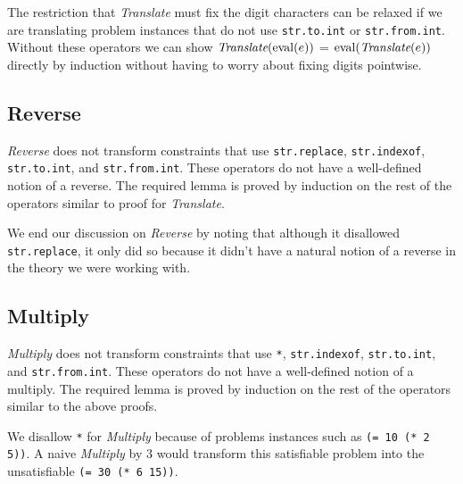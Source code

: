 The restriction that \textit{Translate} must fix the digit characters
can be relaxed if we are translating problem instances that do not use
\texttt{str.to.int} or \texttt{str.from.int}. Without these operators
we can show $\textit{Translate}(\operatorname{eval} (e))$ = $\operatorname{eval}
(\textit{Translate}(e))$ directly by induction without having to worry
about fixing digits pointwise.

\subsection{Reverse}
\textit{Reverse} does not transform constraints that use
\texttt{str.replace}, \texttt{str.indexof}, \texttt{str.to.int}, and
\texttt{str.from.int}. These operators do not have a well-defined
notion of a reverse. The required lemma is proved by induction on the
rest of the operators similar to proof for \textit{Translate}.

We end our discussion on \textit{Reverse} by noting that although it
disallowed \texttt{str.replace}, it only did so because it didn't have
a natural notion of a reverse in the theory we were working with.

\subsection{Multiply}
\textit{Multiply} does not transform constraints that use \texttt{*},
\texttt{str.indexof}, \texttt{str.to.int}, and
\texttt{str.from.int}. These operators do not have a well-defined
notion of a multiply. The required lemma is proved by induction on the
rest of the operators similar to the above proofs.

We disallow \texttt{*} for \textit{Multiply} because of problems
instances such as \texttt{(= 10 (* 2 5))}. A naive \textit{Multiply}
by $3$ would transform this satisfiable problem into the unsatisfiable
\texttt{(= 30 (* 6 15))}.
